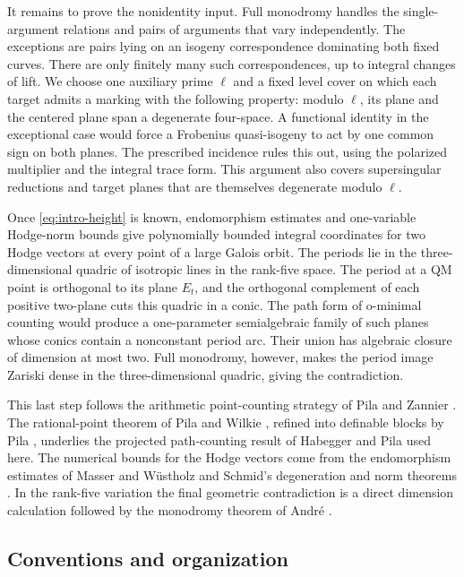 It remains to prove the nonidentity input.  Full monodromy handles the
single-argument relations and pairs of arguments that vary independently.
The exceptions are pairs lying on an isogeny correspondence dominating
both fixed curves.  There are only finitely many such correspondences,
up to integral changes of lift.  We choose one auxiliary prime \(\ell\)
and a fixed level cover on which each target admits a marking with the
following property: modulo \(\ell\), its plane and the centered plane
span a degenerate four-space.  A functional identity in the exceptional
case would force a Frobenius quasi-isogeny to act by one common sign on
both planes.  The prescribed incidence rules this out, using the
polarized multiplier and the integral trace form.  This argument also
covers supersingular reductions and target planes that are themselves
degenerate modulo \(\ell\).

Once \eqref{eq:intro-height} is known, endomorphism estimates and
one-variable Hodge-norm bounds give polynomially bounded integral
coordinates for two Hodge vectors at every point of a large Galois orbit.
The periods lie in the three-dimensional quadric of isotropic lines in
the rank-five space.  The period at a QM point is orthogonal to its
plane \(E_t\), and the orthogonal complement of each positive two-plane
cuts this quadric in a conic.  The path form of o-minimal counting would produce a one-parameter
semialgebraic family of such planes whose conics contain a nonconstant
period arc.  Their union has algebraic closure of dimension at most two.
Full monodromy, however, makes the period image Zariski dense in the
three-dimensional quadric, giving the contradiction.

This last step follows the arithmetic point-counting strategy of
Pila and Zannier \cite{PilaZannier2008}.  The rational-point theorem of
Pila and Wilkie \cite{PilaWilkie2006}, refined into definable blocks
by Pila \cite[Theorem~3.6]{Pila2011}, underlies the projected
path-counting result of Habegger and Pila
\cite[Corollary~7.2]{HabeggerPila2016} used here.  The numerical
bounds for the Hodge vectors come from the endomorphism estimates of
Masser and W\"ustholz \cite{MW1994} and Schmid's degeneration and norm
theorems \cite{Schmid1973}.  In the rank-five variation the final
geometric contradiction is a direct dimension calculation followed
by the monodromy theorem of Andr\'e \cite{Andre1992}.

\subsection{Conventions and organization}

